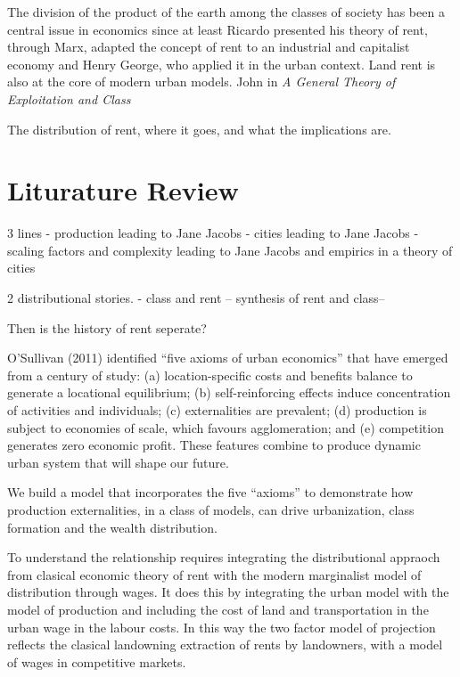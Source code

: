 The division of the product of the earth among the classes of society has been a central issue in economics since at least Ricardo presented his theory of  rent, through Marx, adapted the concept of rent to an industrial and capitalist economy and Henry George, who applied it in the urban context. Land rent is also at the core of modern urban models.  John %
in \textit{A General Theory of Exploitation and Class} 


The distribution of rent, where it goes, and what the implications are. 

\section{Liturature Review}

3 lines  
- production leading to Jane Jacobs
- cities leading to Jane Jacobs
- scaling factors and complexity leading to Jane Jacobs and empirics in a theory of cities

2 distributional stories.
- class and rent -- synthesis of rent and class--

Then is the history of rent seperate?

O’Sullivan (2011) identified “five axioms of urban economics” that have emerged from a century of study: (a) location-specific costs and benefits balance to generate a locational equilibrium; (b) self-reinforcing effects induce concentration of activities and individuals; (c) externalities are prevalent; (d) production is subject to economies of scale, which favours agglomeration; and (e) competition generates zero economic profit. These features combine to produce dynamic urban system that will shape our future. 

We build a model that incorporates the five “axioms” to demonstrate how production externalities, in a class of models, can drive urbanization, class formation and the wealth distribution.

To understand the relationship requires integrating the distributional appraoch from clasical economic theory of rent with the modern marginalist model of distribution through wages. It does this by integrating the urban model with the model of production and including the cost of land and transportation in the urban wage in the labour costs. 
In this way the two factor model of projection reflects the clasical landowning extraction of rents by landowners, with a model of wages in competitive markets. 
\color{red}
